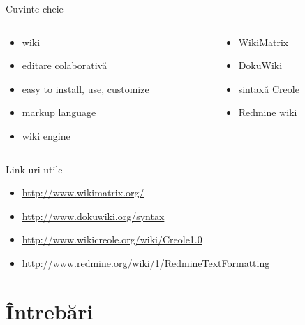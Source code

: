 \documentclass{beamer}
\begin{document}
\begin{frame}{Cuvinte cheie}
  \begin{columns}
    \begin{column}[l]{0.5\textwidth}
      \begin{itemize}
        \item wiki
        \item editare colaborativă
        \item easy to install, use, customize
        \item markup language
        \item wiki engine
      \end{itemize}
    \end{column}
    \begin{column}[l]{0.5\textwidth}
      \begin{itemize}
        \item WikiMatrix
        \item DokuWiki
        \item sintaxă Creole
        \item Redmine wiki
      \end{itemize}
    \end{column}
  \end{columns}
\end{frame}

\begin{frame}{Link-uri utile}
  \begin{itemize}
    \item \url{http://www.wikimatrix.org/}
    \item \url{http://www.dokuwiki.org/syntax}
    \item \url{http://www.wikicreole.org/wiki/Creole1.0}
    \item \url{http://www.redmine.org/wiki/1/RedmineTextFormatting}
  \end{itemize}
\end{frame}


\section{\^{I}ntrebări}

\frame{\tableofcontents[currentsection]}
\end{document}
